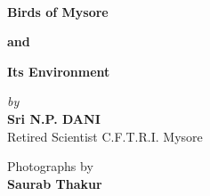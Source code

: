 ~\phantom{a}
\vfill

\thispagestyle{empty}

\begin{center}
{\Huge\bfseries Birds of Mysore}\relax

\bigskip
{\Huge\bfseries and}\relax

\smallskip
\bigskip
{\Huge\bfseries Its Environment}\relax
\end{center}

\vfill

\begin{center}
{\sl by}\\[5pt]
{\Large\bf Sri N.P. DANI}\\[1pt]
{Retired Scientist C.F.T.R.I. Mysore}
\bigskip 

{\large Photographs by}\\[2pt]
{\Large\bf Saurab Thakur}
\vfill
\vfill
\vfill
\vfill
\vfill
\end{center}


 
